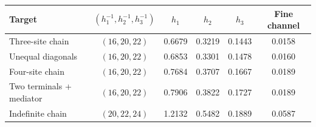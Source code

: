 \begin{tabular}{@{}lccccc@{}}
\toprule
Target & $(h_1^{-1},h_2^{-1},h_3^{-1})$ & $h_1$ & $h_2$ & $h_3$ & Fine channel \\
\midrule
Three-site chain & $(16,20,22)$ & 0.6679 & 0.3219 & 0.1443 & 0.0158 \\
Unequal diagonals & $(16,20,22)$ & 0.6853 & 0.3301 & 0.1478 & 0.0160 \\
Four-site chain & $(16,20,22)$ & 0.7684 & 0.3707 & 0.1667 & 0.0189 \\
Two terminals + mediator & $(16,20,22)$ & 0.7906 & 0.3822 & 0.1727 & 0.0189 \\
Indefinite chain & $(20,22,24)$ & 1.2132 & 0.5482 & 0.1889 & 0.0587 \\
\bottomrule
\end{tabular}
